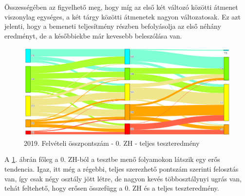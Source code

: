 \documentclass[12pt]{article}
\begin{document}
Összességében az figyelhető meg, hogy míg az első két változó közötti átmenet viszonylag egységes, a két tárgy közötti átmenetek nagyon változatosak. Ez azt jelenti, hogy a bemeneti teljesítmény részben befolyásolja az első néhány eredményt, de a későbbiekbe már kevesebb beleszólása van. 





\begin{figure}[H]
\centering
\includegraphics[width = \textwidth]{kepek/2019_old_felvi_0zh_teszt.png}
\caption{2019. Felvételi összpontszám - 0. ZH - teljes teszteredmény}
\label{fig:2019_old_felvi_0zh_teszt}
\end{figure}

A \ref{fig:2019_old_felvi_0zh_teszt}. ábrán főleg a 0. ZH-ból a tesztbe menő folyamokon látszik egy erős tendencia. Igaz, itt még a régebbi, teljes szerezhető pontszám szerinti felosztás van, így csak négy osztály jött létre, de nagyon kevés többosztálynyi ugrás van, tehát feltehető, hogy erősen összefügg a 0. ZH és a teljes teszteredmény.
\end{document}

